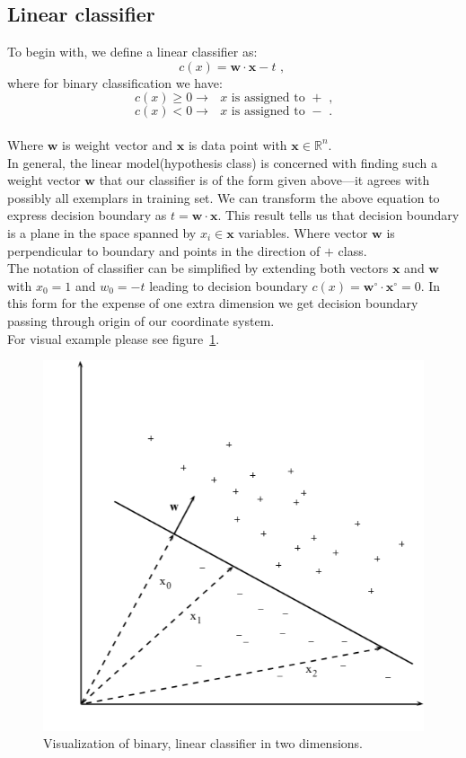 \documentclass[12pt, a4paper, pdflatex, leqno, twoside]{report}
\begin{document}
\subsection{Linear classifier\label{sec:linearclassifiers}}
To begin with, we define a linear classifier as:
$$
c(x) = \mathbf{w} \cdot \mathbf{x} - t \text{~,~}
$$
where for binary classification we have:
$$
c(x) \geq 0 \rightarrow \text{ $x$ is assigned to $+$ ,}
$$
$$
c(x) < 0 \rightarrow \text{ $x$ is assigned to $-$ .}
$$\\

Where $\mathbf{w}$ is weight vector and $\mathbf{x}$ is data point with 
$\mathbf{x} \in \mathbb{R}^n$.\\
In general, the linear model(hypothesis class) is concerned with finding such a 
weight vector $\mathbf{w}$ that our classifier is of the form given above---it agrees with possibly all exemplars in training set. 
We can transform the above equation to express decision boundary as $t = \mathbf{w} 
\cdot \mathbf{x}$. This result tells us that decision boundary is a plane in 
the space spanned by $x_i \in \mathbf{x}$ variables. Where vector $\mathbf{w}$ 
is perpendicular to boundary and points in the direction of $+$ class.\\
The notation of classifier can be simplified by extending both vectors 
$\mathbf{x}$ and $\mathbf{w}$ with $x_0 = 1$ and $w_0 = -t$ leading to decision 
boundary $c(x) = \mathbf{w}^{\circ} \cdot \mathbf{x}^{\circ} = 0$. In this form 
for the expense of one extra dimension we get decision boundary passing through 
origin of our coordinate system.\\
For visual example please see figure~\ref{fig:binclas}.\\

\begin{figure}[htbp]
  \centering
  \includegraphics[width=0.5\linewidth]{graphics/binclas.png}
  \begin{tiny}
    \caption{Visualization of binary, linear classifier in two 
dimensions.\label{fig:binclas}}
  \end{tiny}
  \vspace{1cm}
\end{figure}
\end{document}
